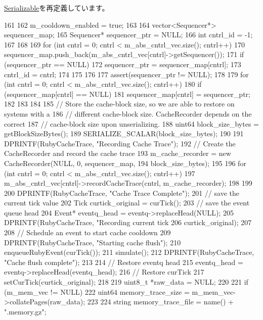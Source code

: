 \hyperlink{classSerializable_ad6272f80ae37e8331e3969b3f072a801}{Serializable}を再定義しています。


\begin{DoxyCode}
161 {
162     m_cooldown_enabled = true;
163 
164     vector<Sequencer*> sequencer_map;
165     Sequencer* sequencer_ptr = NULL;
166     int cntrl_id = -1;
167 
168 
169     for (int cntrl = 0; cntrl < m_abs_cntrl_vec.size(); cntrl++) {
170         sequencer_map.push_back(m_abs_cntrl_vec[cntrl]->getSequencer());
171         if (sequencer_ptr == NULL) {
172             sequencer_ptr = sequencer_map[cntrl];
173             cntrl_id = cntrl;
174         }
175     }
176 
177     assert(sequencer_ptr != NULL);
178 
179     for (int cntrl = 0; cntrl < m_abs_cntrl_vec.size(); cntrl++) {
180         if (sequencer_map[cntrl] == NULL) {
181             sequencer_map[cntrl] = sequencer_ptr;
182         }
183     }
184 
185     // Store the cache-block size, so we are able to restore on systems with a
186     // different cache-block size. CacheRecorder depends on the correct
187     // cache-block size upon unserializing.
188     uint64 block_size_bytes = getBlockSizeBytes();
189     SERIALIZE_SCALAR(block_size_bytes);
190 
191     DPRINTF(RubyCacheTrace, "Recording Cache Trace\n");
192     // Create the CacheRecorder and record the cache trace
193     m_cache_recorder = new CacheRecorder(NULL, 0, sequencer_map,
194                                          block_size_bytes);
195 
196     for (int cntrl = 0; cntrl < m_abs_cntrl_vec.size(); cntrl++) {
197         m_abs_cntrl_vec[cntrl]->recordCacheTrace(cntrl, m_cache_recorder);
198     }
199 
200     DPRINTF(RubyCacheTrace, "Cache Trace Complete\n");
201     // save the current tick value
202     Tick curtick_original = curTick();
203     // save the event queue head
204     Event* eventq_head = eventq->replaceHead(NULL);
205     DPRINTF(RubyCacheTrace, "Recording current tick %
206             curtick_original);
207 
208     // Schedule an event to start cache cooldown
209     DPRINTF(RubyCacheTrace, "Starting cache flush\n");
210     enqueueRubyEvent(curTick());
211     simulate();
212     DPRINTF(RubyCacheTrace, "Cache flush complete\n");
213 
214     // Restore eventq head
215     eventq_head = eventq->replaceHead(eventq_head);
216     // Restore curTick
217     setCurTick(curtick_original);
218 
219     uint8_t *raw_data = NULL;
220 
221     if (m_mem_vec != NULL) {
222         uint64 memory_trace_size = m_mem_vec->collatePages(raw_data);
223 
224         string memory_trace_file = name() + ".memory.gz";
}}
\end{DoxyCode}
